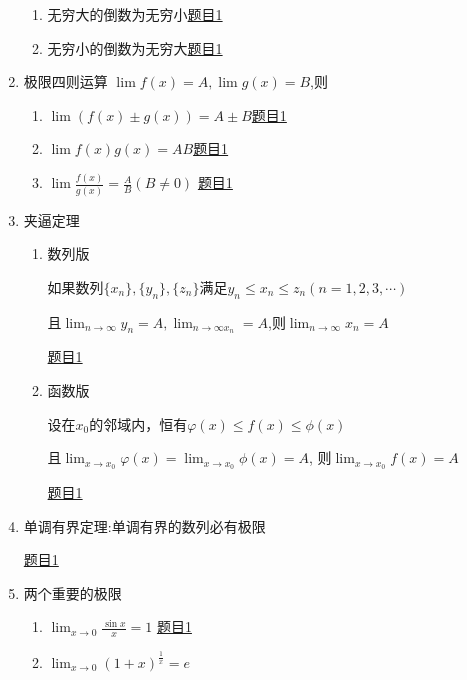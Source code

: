 \documentclass[12pt]{article} %
\begin{document}
\begin{enumerate}
\begin{enumerate}
        \item 无穷大的倒数为无穷小\quad \href{https://www.matongxue.com/matex/2596/react/}{题目1}
        \item 无穷小的倒数为无穷大\quad \href{https://www.matongxue.com/matex/2597/react/}{题目1}
    \end{enumerate}
\item 极限四则运算
    $\lim f(x)=A,\lim g(x)=B$,则
    \begin{enumerate}
        \item $\lim (f(x) \pm g(x))=A \pm B$\quad \href{https://www.matongxue.com/matex/2598/react/}{题目1}
        \item $\lim f(x)g(x)=AB$\quad \href{https://www.matongxue.com/matex/2599/react/}{题目1}
        \item $\displaystyle\lim \frac{f(x)}{g(x)}=\frac{A}{B}(B \neq 0)$
        \quad \href{https://www.matongxue.com/matex/2600/react/}{题目1}
    \end{enumerate}
\item 夹逼定理
    \begin{enumerate} 
        \item 数列版
        \par 如果数列$\{x_n\},\{y_n\},\{z_n\}$满足$y_n\leq x_n \leq z_n(n=1,2,3,\cdots)$
        \par 且$\displaystyle\lim_{n\to\infty}y_n=A,\lim_{n\to\infty x_n}=A$,则$\displaystyle\lim_{n\to\infty}x_n=A$
        \par \href{https://www.matongxue.com/matex/2602/react/}{题目1}
        \item 函数版
        \par 设在$x_0$的邻域内，恒有$\varphi(x)\leq f(x) \leq \phi(x)$
        \par 且$\displaystyle\lim_{x\to x_0}\varphi(x)=\lim_{x\to x_0}\phi(x)=A$,
        则$\displaystyle\lim_{x\to x_0}f(x)=A$
        \par \href{https://www.matongxue.com/matex/2601/react/}{题目1}
    \end{enumerate}
\item 单调有界定理:单调有界的数列必有极限
    \par \href{https://www.matongxue.com/matex/2603/react/}{题目1}
\item 两个重要的极限
    \begin{enumerate}
        \item $\displaystyle\lim_{x\to 0}\frac{\sin x}{x}=1$
        \quad \href{https://www.matongxue.com/matex/2604/react/}{题目1}
        \item $\displaystyle\lim_{x\to 0}(1+x)^{\frac{1}{x}}=e$

\end{enumerate}
\end{enumerate}
\end{document}
